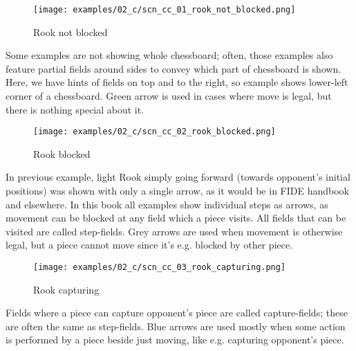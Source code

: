 \vspace*{-0.7\baselineskip}
\noindent
\begin{wrapfigure}[12]{l}{0.4\textwidth}
\centering
\texttt{[image: examples/02\_c/scn\_cc\_01\_rook\_not\_blocked.png]}
\vspace*{-1.4\baselineskip}
\caption{Rook not blocked}
\label{fig:scn_cc_01_rook_not_blocked}
\end{wrapfigure}
Some examples are not showing whole chessboard; often, those examples also
feature partial fields around sides to convey which part of chessboard is
shown.\newline
\indent
Here, we have hints of fields on top and to the right, so example shows
lower-left corner of a chessboard.\newline
\indent
Green arrow is used in cases where move is legal, but there is nothing special
about it.

\vspace*{2.7\baselineskip}
\noindent
\begin{wrapfigure}[14]{l}{0.4\textwidth}
\centering
\texttt{[image: examples/02\_c/scn\_cc\_02\_rook\_blocked.png]}
\vspace*{-1.4\baselineskip}
\caption{Rook blocked}
\label{fig:scn_cc_02_rook_blocked}
\end{wrapfigure}
In previous example, light Rook simply going forward (towards opponent's initial
positions) was shown with only a single arrow, as it would be in FIDE handbook and
elsewhere.\newline
\indent
In this book all examples show individual steps as arrows, as movement can be
blocked at any field which a piece visits. All fields that can be visited are
called step-fields.\newline
\indent
Grey arrows are used when movement is otherwise legal, but a piece cannot move
since it's e.g. blocked by other piece.

\clearpage %

\vspace*{-1.4\baselineskip}
\noindent
\begin{wrapfigure}[8]{l}{0.4\textwidth}
\centering
\texttt{[image: examples/02\_c/scn\_cc\_03\_rook\_capturing.png]}
\vspace*{-1.4\baselineskip}
\caption{Rook capturing}
\label{fig:scn_cc_03_rook_capturing}
\end{wrapfigure}
Fields where a piece can capture opponent's piece are called capture-fields;
these are often the same as step-fields.\newline
\indent
Blue arrows are used mostly when some action is performed by a piece beside just
moving, like e.g. capturing opponent's piece.

